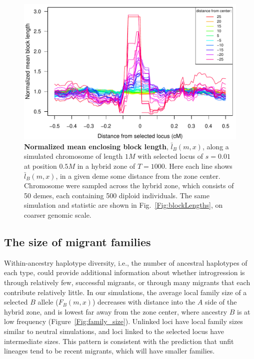 \documentclass[11pt,letterpaper]{article}
\begin{document}
\begin{figure}
\includegraphics{figs/blocksAlongChromAncBConditioningHighRes.pdf}
\caption{\textbf{Normalized mean enclosing block length}, $\bar l_B(m,x)$, along a simulated chromosome of length $1M$ with selected locus of $s=0.01$ at position $0.5M$ in a hybrid zone of $T=1000$. 
    Here each line shows $\bar l_B(m,x)$, in a given deme some distance from the zone center. %
    Chromosome were sampled across the hybrid zone, which consists of 50 demes, each containing 500 diploid individuals. 
    The same simulation and statistic are shown in Fig.~\ref{Fig:blockLengths}, on coarser genomic scale.
}\label{Fig:blockLengthsZoom}
\end{figure}


\subsection*{The size of migrant families}

Within-ancestry haplotype diversity, i.e., the number of ancestral haplotypes of each type,
could provide additional information about whether introgression is through relatively few, successful migrants, 
or through many migrants that each contribute relatively little. 
In our simulations, the average local family size of a selected $B$ allele ($F_B(m,x)$) decreases with distance into the $A$ side of the hybrid zone, 
and is lowest far away from the zone center, where ancestry $B$ is at low frequency (Figure~\ref{Fig:family_size}). 
Unlinked loci have local family sizes similar to neutral simulations,
and loci linked to the selected locus have intermediate sizes.
This pattern is consistent with the prediction 
that unfit lineages tend to be recent migrants,
which will have smaller families.  
\end{document}
